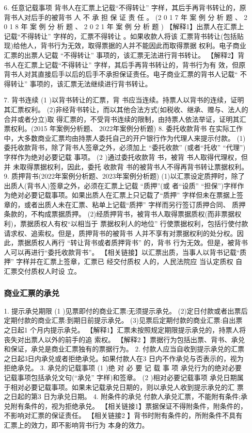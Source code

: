 \documentclass[UTF8,12pt]{ctexart}
\numberwithin{equation}{section} %
\numberwithin{figure}{section}
\numberwithin{table}{section}
\begin{document}
	6. 任意记载事项
	背书人在汇票上记载“不得转让” 字样，其后手再背书转让的，原背书人对后手的被背书 人 不 承 担 保 证 责 任 。 (2 0 1 7 年 案 例 分 析 题 、 2 0 1 8 年 案 例 分 析 题 、 2 0 2 1 年 案 例 分 析 题 )
	【解释1】出票人在汇票上记载“不得转让” 字样的，汇票不得转让 。如果收款人将该 汇票背书转让(包括贴现)给他人，背书行为无效，取得票据的人并不能因此而取得票据 权利。电子商业汇票的出票人记载 “不得转让” 事项的，该汇票无法进行背书转让。 【解释2】背书人在汇票上记载“不得转让” 字样，其后手再背书转让的，背书行为有 效，但原背书人对其直接后手以后的后手不承担保证责任。电子商业汇票的背书人记载“ 不 得转让” 事项的，该汇票无法继续进行背书转让。
	
	7. 背书连续
	(1 )以背书转让的汇票，背 书应当连续。持票人以背书的连续，证明其汇票权利。 (2)非经背书转让，而以其他合法方式(如税收、继承、赠与、法人的合并或者分立)取 得汇票的，不受背书连续的限制，由持票人依法举证，证明其汇票权利。(2015 年案例分析题、 2022年案例分析题)
	8. 委托收款背书 在实际工作中，大多数商业汇票均由持票人委托自己的开户银行作为代理人来提示付款。 (1)委托收款背书，除了背书人签章之外，必须加上 “委托收款” (或者“托收” “代理”) 字样作为绝对必要记载 事项。
	(2 )通过委托收款背 书，被背 书人取得代理权，但并 未取得票据权利，因此，委托 收款背 书的被背书人不得再背书转让票据权利。
	9. 质押背书(2022年案例分析题、2023年案例分析题) (1)以汇票设定质押时，除了出质人(背书人)签章之外，必须在汇票上记载 “质押”(或 者“设质” “担保”)字样作为绝对必要记载事项。如果出质人在汇票上只记载了“质押” 字样但未在票据上签章的，或者出质人未在汇票、粘单上记载“质押” 字样而另行签订质押合同、 质押条款的，不构成票据质押。 (2)经质押背书，被背书人取得票据质权(而非票据权利)，票据质权人有权“以相当于 票据权利人的地位” 行使票据权利，包括行使付款请求权、追索权。但是，质押背书的被背书 人并不享有对票据权利的处分权。因此，票据质权人再行 “转让背书或者质押背书” 的，背书 行为无效。但是，被背书人可以再进行“委托收款背书”。 【相关链接】以汇票出质，当事人以背书记载“质押” 字样并在汇票上签章，汇票已 经交付质权 人的，人民法院应 当认定质权 自汇票交付质权人时设 立。
	
	\subsubsection{商业汇票的承兑} 
	1. 提示承兑期限
	(1 )见票即付的商业汇票:无须提示承兑。 (2)定日付款或者出票后定期付款的商业汇票:到期日前提示承兑。 (3)见票后定期付款的商业汇票:自出票之日起1 个月内提示承兑。
	【解释1】汇票未按照规定期限提示承兑的，持票人将丧失对出票人以外的前手的追 索权。
	【解释2 】票据行为包括出票、背书、承兑和保证，承兑是商业汇票独有的票据行为。
	2. 付款人应当自收到提示承兑的汇票之日起3日内承兑或者拒绝承兑。如果付款人在3 日内不作承兑与否表示的，视为拒绝承兑。
	3. 承兑的记载事项
	(1 )绝 对 必 要 记 载 事 项
	承兑行为的绝对必要记载事项包括承兑文句(“承兑” 字样)和签章。
	(2 )相对必要记载事项 承兑日期属于相对必要记载事项。如果未记载承兑日期的，则以承兑人收到提示承兑的汇 票之日起的第3 日为承兑日期。
	4. 附条件的承兑
	付款人承兑汇票，不能附有条件;承兑附有条件的，视为拒绝承兑。
	【相关链接1】票据保证不得附条件，附条件的，不影响对汇票的保证责任。 【相关链接2 】背书时附有条件的，所附条件不具有汇票上的效力，即不影响背书行为 本身的效力。
	
\end{document}
